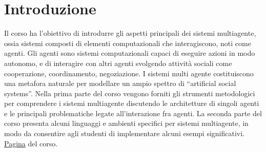 \section{Introduzione}
Il corso ha l’obiettivo di introdurre gli aspetti principali dei sistemi multiagente, ossia sistemi composti di elementi computazionali che interagiscono, noti come agenti. Gli agenti sono sistemi computazionali capaci di eseguire azioni in modo autonomo, e di interagire con altri agenti svolgendo attività sociali come cooperazione, coordinamento, negoziazione. I sistemi multi agente costituiscono una metafora naturale per modellare un ampio spettro di “artificial social systems”. Nella prima parte del corso vengono forniti gli strumenti metodologici per comprendere i sistemi multiagente discutendo le architetture di singoli agenti e le principali problematiche legate all’interazione fra agenti. La seconda parte del corso presenta alcuni linguaggi e ambienti specifici per sistemi multiagente, in modo da consentire agli studenti di implementare alcuni esempi significativi.
\href{http://magistrale.educ.di.unito.it/index.php/offerta-formativa/insegnamenti/laurea-magistrale/insegnamenti-laurea-magistrale/scheda-insegnamento?cod=MFN1348&codA=&year=2022&orienta=YXFHO}{Pagina} del corso.